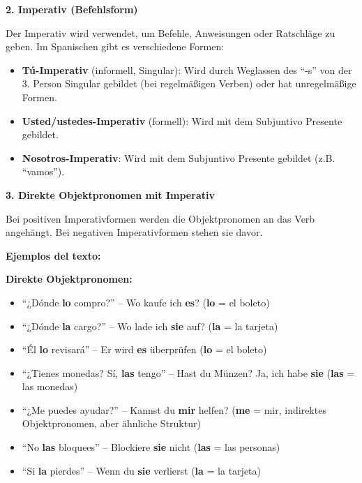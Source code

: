 \documentclass[12pt,a4paper]{article}
\begin{document}
\textbf{2. Imperativ (Befehlsform)}

Der Imperativ wird verwendet, um Befehle, Anweisungen oder Ratschläge zu geben. Im Spanischen gibt es verschiedene Formen:

\begin{itemize}[leftmargin=*]
    \item \textbf{Tú-Imperativ} (informell, Singular): Wird durch Weglassen des \enquote{-s} von der 3. Person Singular gebildet (bei regelmäßigen Verben) oder hat unregelmäßige Formen.
    \item \textbf{Usted/ustedes-Imperativ} (formell): Wird mit dem Subjuntivo Presente gebildet.
    \item \textbf{Nosotros-Imperativ}: Wird mit dem Subjuntivo Presente gebildet (z.B. \enquote{vamos}).
\end{itemize}

\textbf{3. Direkte Objektpronomen mit Imperativ}

Bei positiven Imperativformen werden die Objektpronomen an das Verb angehängt. Bei negativen Imperativformen stehen sie davor.

\textbf{Ejemplos del texto:}

\textbf{Direkte Objektpronomen:}
\begin{itemize}[leftmargin=*]
    \item \enquote{¿Dónde \textbf{lo} compro?} -- Wo kaufe ich \textbf{es}? (\textbf{lo} = el boleto)
    \item \enquote{¿Dónde \textbf{la} cargo?} -- Wo lade ich \textbf{sie} auf? (\textbf{la} = la tarjeta)
    \item \enquote{Él \textbf{lo} revisará} -- Er wird \textbf{es} überprüfen (\textbf{lo} = el boleto)
    \item \enquote{¿Tienes monedas? Sí, \textbf{las} tengo} -- Hast du Münzen? Ja, ich habe \textbf{sie} (\textbf{las} = las monedas)
    \item \enquote{¿Me puedes ayudar?} -- Kannst du \textbf{mir} helfen? (\textbf{me} = mir, indirektes Objektpronomen, aber ähnliche Struktur)
    \item \enquote{No \textbf{las} bloquees} -- Blockiere \textbf{sie} nicht (\textbf{las} = las personas)
    \item \enquote{Si \textbf{la} pierdes} -- Wenn du \textbf{sie} verlierst (\textbf{la} = la tarjeta)
\end{itemize}
\end{document}
